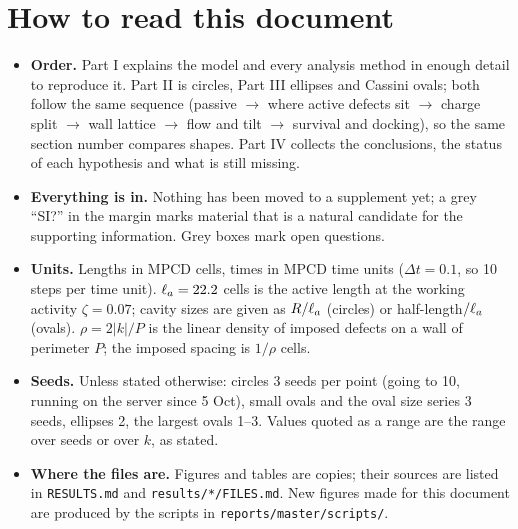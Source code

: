 \section*{How to read this document}
\begin{itemize}
  \item \textbf{Order.} Part I explains the model and every analysis method in enough detail to reproduce it. Part II is
        circles, Part III ellipses and Cassini ovals; both follow the same sequence (passive $\to$ where active defects
        sit $\to$ charge split $\to$ wall lattice $\to$ flow and tilt $\to$ survival and docking), so the same section number
        compares shapes. Part IV collects the conclusions, the status of each hypothesis and what is still missing.
  \item \textbf{Everything is in.} Nothing has been moved to a supplement yet; a grey ``SI?'' in the margin marks material
        that is a natural candidate for the supporting information. Grey boxes mark open questions.
  \item \textbf{Units.} Lengths in MPCD cells, times in MPCD time units ($\Delta t=0.1$, so 10 steps per time unit).
        $\ell_a=22.2$ cells is the active length at the working activity $\zeta=0.07$; cavity sizes are given as $R/\ell_a$
        (circles) or half-length$/\ell_a$ (ovals). $\rho=2|k|/P$ is the linear density of imposed defects on a wall of
        perimeter $P$; the imposed spacing is $1/\rho$ cells.
  \item \textbf{Seeds.} Unless stated otherwise: circles 3 seeds per point (going to 10, running on the server since
        5 Oct), small ovals and the oval size series 3 seeds, ellipses 2, the largest ovals 1--3. Values quoted as a range are
        the range over seeds or over $k$, as stated.
  \item \textbf{Where the files are.} Figures and tables are copies; their sources are listed in \texttt{RESULTS.md} and
        \texttt{results/*/FILES.md}. New figures made for this document are produced by the scripts in
        \texttt{reports/master/scripts/}.
\end{itemize}

